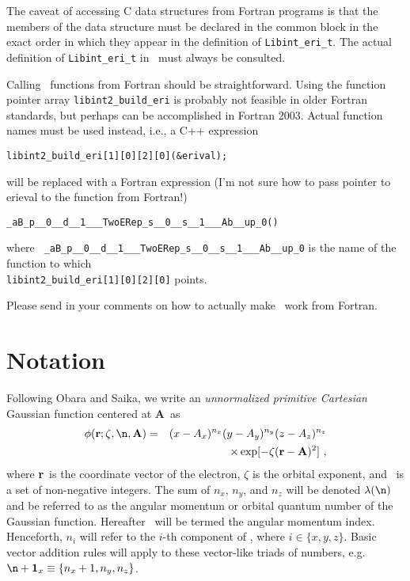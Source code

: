 \documentclass[10pt]{article}
\begin{document}
The caveat of accessing C data structures from Fortran programs is that the members of the data structure must be
declared in the common block in the exact order in which they appear in the definition of {\tt Libint\_eri\_t}.
The actual definition of {\tt Libint\_eri\_t} in \libinttypesh\ must always be consulted.

Calling \LIBINT\ functions from Fortran should be straightforward. Using the function pointer array {\tt libint2\_build\_eri} is probably
not feasible in older Fortran standards, but perhaps can be accomplished in Fortran 2003. Actual function names must be used instead, i.e.,
a C++ expression
\begin{verbatim}
libint2_build_eri[1][0][2][0](&erival);
\end{verbatim}
will be replaced with a Fortran expression (I'm not sure how to pass pointer to erieval to the function from Fortran!)
\begin{verbatim}
_aB_p__0__d__1___TwoERep_s__0__s__1___Ab__up_0()
\end{verbatim}
where {\tt
\_aB\_p\_\_0\_\_d\_\_1\_\_\_TwoERep\_s\_\_0\_\_s\_\_1\_\_\_Ab\_\_up\_0} is the
name of the function to which \\
{\tt libint2\_build\_eri[1][0][2][0]} points.

Please send in your comments on how to actually make \LIBINT\ work from Fortran.


\appendix
\appendixpage
\section{\label{sec:notation} Notation}

Following Obara and Saika,\cite{Obara86}
we write an {\em unnormalized primitive Cartesian} Gaussian function centered at {\bf A}\ as
\begin{eqnarray}
\phi ({\bf r}; \zeta, \n, {\bf A}) & = & (x - A_x)^{n_x} (y - A_y)^{n_y} (z - A_z)^{n_z} \nonumber \\
& & \times \exp [-\zeta({\bf r}-{\bf A})^2]\ ,
\end{eqnarray}
where {\bf r}\ is the coordinate vector of the electron, $\zeta$ is the orbital exponent, and
\n\ is a set of non-negative integers. The sum of $n_x$, $n_y$, and $n_z$ will be denoted $\lambda(\n)$
and be referred to as the angular momentum or orbital quantum number of the Gaussian function.
Hereafter \n\ will be termed the angular momentum index.
Henceforth, $n_i$ will refer to the $i$-th component of \n, where $i \in \{x, y, z\}$.
Basic vector addition rules will apply to these vector-like triads of numbers, e.g.
$\n + {\bf 1}_x \equiv \{ n_x+1, n_y, n_z\}$.
\end{document}
